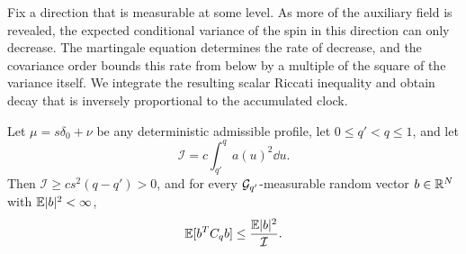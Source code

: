 Fix a direction that is measurable at some level. As more of the
auxiliary field is revealed, the expected conditional variance of the
spin in this direction can only decrease. The martingale equation
determines the rate of decrease, and the covariance order bounds this
rate from below by a multiple of the square of the variance itself. We integrate
the resulting scalar Riccati inequality and obtain decay that is
inversely proportional to the accumulated clock.

\begin{lemma}\label{lem:th-ric}
Let $\mu=s\delta_0+\nu$ be any deterministic admissible profile, let
$0\le q'<q\le1$, and let
\[
 \mathcal I=c\int_{q'}^qa(u)^2\dd u .
\]
Then $\mathcal I\ge cs^2(q-q')>0$, and for every
$\mathcal G_{q'}$-measurable random vector $b\in\mathbb R^N$ with $\mathbb E|b|^2<\infty$,
\[
 \mathbb E[b^TC_qb]\le\frac{\mathbb E|b|^2}{\mathcal I}.
\]
\end{lemma}

